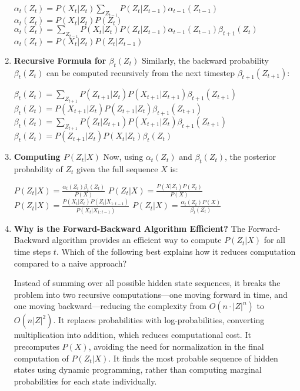 \documentclass[12pt,letterpaper, onecolumn]{exam}
\begin{document}
\begin{questions}
\begin{enumerate}[label=(\alph*)]
\begin{choices}
    \choice \( \alpha_t(Z_t) = P(X_t | Z_t) \sum_{Z_{t-1}} P(Z_t | Z_{t-1}) \alpha_{t-1}(Z_{t-1}) \)
    \choice \( \alpha_t(Z_t) = P(X_t | Z_t) P(Z_t) \)
    \choice \( \alpha_t(Z_t) = \sum_{Z_{t-1}} P(X_t | Z_t) P(Z_t | Z_{t-1}) \alpha_{t-1}(Z_{t-1}) \beta_{t+1}(Z_t) \)
    \choice \( \alpha_t(Z_t) = P(X_t | Z_t) P(Z_t | Z_{t-1}) \)
\end{choices}

    \item \textbf{Recursive Formula for \( \beta_t(Z_t) \)}
    Similarly, the backward probability \( \beta_t(Z_t) \) can be computed recursively from the next timestep \( \beta_{t+1}(Z_{t+1}) \):

\begin{choices}
    \choice \( \beta_t(Z_t) = \sum_{Z_{t+1}} P(Z_{t+1} | Z_t) P(X_{t+1} | Z_{t+1}) \beta_{t+1}(Z_{t+1}) \)
    \choice \( \beta_t(Z_t) = P(X_{t+1} | Z_t) P(Z_{t+1} | Z_t) \beta_{t+1}(Z_{t+1}) \)
    \choice \( \beta_t(Z_t) = \sum_{Z_{t+1}} P(Z_t | Z_{t+1}) P(X_{t+1} | Z_t) \beta_{t+1}(Z_{t+1}) \)
    \choice \( \beta_t(Z_t) = P(Z_{t+1} | Z_t) P(X_t | Z_t) \beta_t(Z_t) \)
\end{choices}

    \item \textbf{Computing \( P(Z_t | X) \)}
    Now, using \( \alpha_t(Z_t) \) and \( \beta_t(Z_t) \), the posterior probability of \( Z_t \) given the full sequence \( X \) is:

\begin{choices}
    \choice \( P(Z_t | X) = \frac{\alpha_t(Z_t) \beta_t(Z_t)}{P(X)} \)
    \choice \( P(Z_t | X) = \frac{P(X | Z_t) P(Z_t)}{P(X)} \)
    \choice \( P(Z_t | X) = \frac{P(X_t | Z_t) P(Z_t | X_{1:t-1})}{P(X_t | X_{1:t-1})} \)
    \choice \( P(Z_t | X) = \frac{\alpha_t(Z_t) P(X)}{\beta_t(Z_t)} \)
\end{choices}

    \item \textbf{Why is the Forward-Backward Algorithm Efficient?}
    The Forward-Backward algorithm provides an efficient way to compute \( P(Z_t | X) \) for all time steps \( t \). Which of the following best explains how it reduces computation compared to a naive approach?

\begin{choices}
    \choice Instead of summing over all possible hidden state sequences, it breaks the problem into two recursive computations—one moving forward in time, and one moving backward—reducing the complexity from \( O(n \cdot |Z|^n) \) to \( O(n |Z|^2) \).
    \choice It replaces probabilities with log-probabilities, converting multiplication into addition, which reduces computational cost.
    \choice It precomputes \( P(X) \), avoiding the need for normalization in the final computation of \( P(Z_t | X) \).
    \choice It finds the most probable sequence of hidden states using dynamic programming, rather than computing marginal probabilities for each state individually.
\end{choices}


\end{enumerate}
\end{questions}
\end{document}
